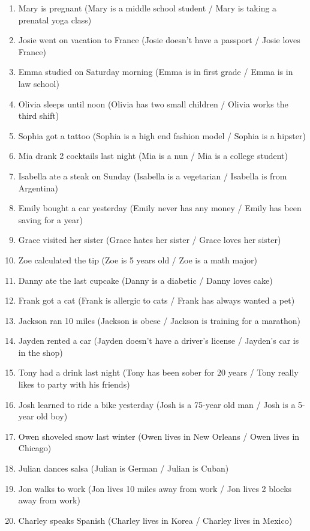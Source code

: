 \documentclass[11pt,fleqn]{article}
\newcommand{\6}{\mbox{$[\hspace*{-.6mm}[$}}
\newcommand{\9}{\mbox{$]\hspace*{-.6mm}]$}}
\begin{document}
\begin{enumerate}[leftmargin=3ex,itemsep=-2pt]
\item Mary is pregnant (Mary is a middle school student / Mary is taking a prenatal yoga class)
\item Josie went on vacation to France (Josie doesn't have a passport / Josie loves France)
\item Emma studied on Saturday morning (Emma is in first grade / Emma is in law school)
\item Olivia sleeps until noon (Olivia has two small children / Olivia works the third shift)
\item Sophia got a tattoo (Sophia is a high end fashion model / Sophia is a hipster)
\item Mia drank 2 cocktails last night (Mia is a nun / Mia is a college student)
\item Isabella ate a steak on Sunday (Isabella is a vegetarian / Isabella is from Argentina)
\item Emily bought a car yesterday (Emily never has any money / Emily has been saving for a year)
\item Grace visited her sister (Grace hates her sister / Grace loves her sister)
\item Zoe calculated the tip (Zoe is 5 years old / Zoe is a math major)
\item Danny ate the last cupcake (Danny is a diabetic / Danny loves cake)
\item Frank got a cat (Frank is allergic to cats / Frank has always wanted a pet)
\item Jackson ran 10 miles (Jackson is obese / Jackson is training for a marathon)
\item Jayden rented a car (Jayden doesn't have a driver's license / Jayden's car is in the shop)
\item Tony had a drink last night (Tony has been sober for 20 years / Tony really likes to party with his friends)
\item Josh learned to ride a bike yesterday (Josh is a 75-year old man / Josh is a 5-year old boy)
\item Owen shoveled snow last winter (Owen lives in New Orleans / Owen lives in Chicago)
\item Julian dances salsa (Julian is German / Julian is Cuban)
\item Jon walks to work (Jon lives 10 miles away from work / Jon lives 2 blocks away from work)
\item Charley speaks Spanish (Charley lives in Korea / Charley lives in Mexico)
\end{enumerate}
\end{document}

